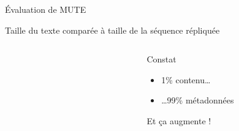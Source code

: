 \begin{frame}{Évaluation de MUTE}
    \begin{block}{Taille du texte comparée à taille de la séquence répliquée}
        \begin{columns}
            \begin{column}{0.6\textwidth}
                \begin{figure}
                \end{figure}
            \end{column}
            \begin{column}{0.4\textwidth}
                \begin{block}{Constat}
                    \begin{itemize}
                        \item 1\% contenu\dots
                        \item \dots 99\% métadonnées
                    \end{itemize}
                \end{block}
                \pause
                \begin{center}
                    \alert{Et ça augmente !}

\end{center}
\end{column}
\end{columns}
\end{block}
\end{frame}
